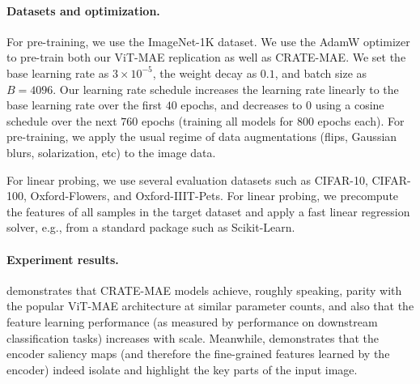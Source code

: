 \documentclass[../../book-main.tex]{subfiles}
\begin{document}
\paragraph{Datasets and optimization.} For pre-training, we use the
ImageNet-1K dataset. We use the AdamW optimizer to pre-train both our
ViT-MAE replication as well as CRATE-MAE. We set the base learning
rate as \(3 \times 10^{-5}\), the weight decay as \(0.1\), and batch
size as \(B = 4096\). Our learning rate schedule increases the
learning rate linearly to the base learning rate over the first
\(40\) epochs, and decreases to \(0\) using a cosine schedule over
the next \(760\) epochs (training all models for \(800\) epochs
each). For pre-training, we apply the usual regime of data
augmentations (flips, Gaussian blurs, solarization, etc) to the image data.

For linear probing, we use several evaluation datasets such as
CIFAR-10, CIFAR-100, Oxford-Flowers, and Oxford-IIIT-Pets. For linear
probing, we precompute the features of all samples in the target
dataset and apply a fast linear regression solver, e.g., from a
standard package such as Scikit-Learn.

\paragraph{Experiment results.} 
demonstrates that CRATE-MAE models achieve, roughly speaking, parity
with the popular ViT-MAE architecture at similar parameter counts,
and also that the feature learning performance (as measured by
performance on downstream classification tasks) increases with scale.
Meanwhile,  demonstrates that the
encoder saliency maps (and therefore the fine-grained features
learned by the encoder) indeed isolate and highlight the key parts of
the input image.
\end{document}
